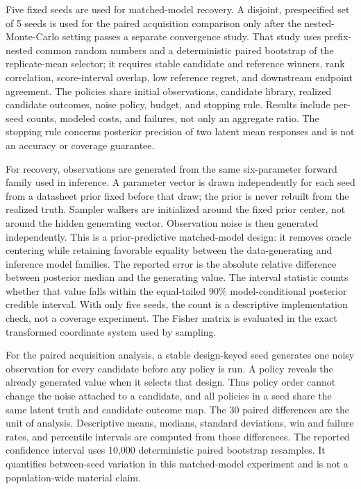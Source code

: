 \documentclass[10pt,a4paper,twocolumn]{article}
\makeatletter
\renewcommand\section{\@startsection{section}{1}{0pt}{1.2ex plus .2ex}{.5ex}{\centering\normalsize\bfseries\scshape}}
\providecommand{\EIGSeedCount}{5}
\makeatother
\begin{document}
\section{Evaluation Protocol}
Five fixed seeds are used for matched-model recovery. A disjoint, prespecified
set of \EIGSeedCount{} seeds is used for the paired acquisition comparison only
after the nested-Monte-Carlo setting passes a separate convergence study.
That study uses prefix-nested common random numbers and a deterministic paired
bootstrap of the replicate-mean selector; it requires stable candidate and
reference winners, rank correlation, score-interval overlap, low reference
regret, and downstream endpoint agreement. The policies share initial observations,
candidate library, realized candidate outcomes, noise policy, budget, and stopping
rule. Results include per-seed counts, modeled costs, and failures, not only
an aggregate ratio. The stopping rule concerns posterior precision
of two latent mean responses and is not an accuracy or coverage guarantee.

For recovery, observations are generated from the same six-parameter forward
family used in inference. A parameter vector is drawn independently for each
seed from a datasheet prior fixed before that draw; the prior is never rebuilt
from the realized truth. Sampler walkers are initialized around the fixed
prior center, not around the hidden generating vector. Observation noise is
then generated independently. This is a prior-predictive matched-model design:
it removes oracle centering while retaining favorable equality between the
data-generating and inference model families. The reported error is the absolute
relative difference between posterior median and the generating value. The
interval statistic counts whether that value falls within the equal-tailed
90\% model-conditional posterior credible interval. With only five seeds, the
count is a descriptive implementation check, not a coverage experiment.
The Fisher matrix is evaluated in the exact transformed coordinate system used
by sampling.

For the paired acquisition analysis, a stable design-keyed seed generates one
noisy observation for every candidate before any policy is run. A policy
reveals the already generated value when it selects that design. Thus policy
order cannot change the noise attached to a candidate, and all policies in a
seed share the same latent truth and candidate outcome map. The 30 paired
differences are the unit of analysis. Descriptive means, medians, standard
deviations, win and failure rates, and percentile intervals are computed from
those differences. The reported confidence interval uses 10,000 deterministic
paired bootstrap resamples. It quantifies between-seed variation in this
matched-model experiment and is not a population-wide material claim.
\end{document}
